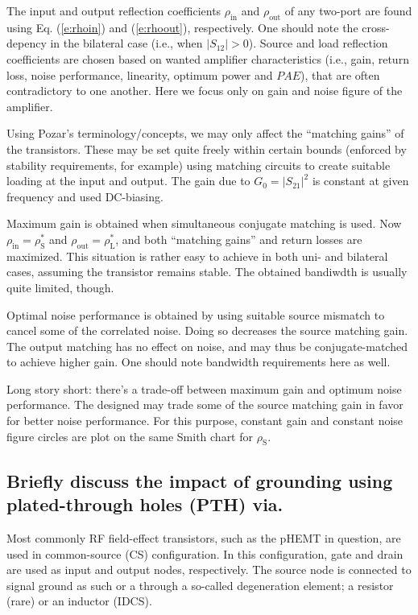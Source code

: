 \documentclass[a4paper, 12pt]{article}
\begin{document}
The input and output reflection coefficients $\rho_\mathrm{in}$ and $\rho_\mathrm{out}$ 
of any two-port are found using Eq. (\ref{e:rhoin}) and (\ref{e:rhoout}), respectively. 
One should note the cross-depency in the bilateral case (i.e., when $|S_{12}| > 0$). 
Source and load reflection coefficients are chosen based on wanted amplifier characteristics 
(i.e., gain, return loss, noise performance, linearity, optimum power and $\mathit{PAE}$), 
that are often contradictory to one another. Here we focus only on gain and noise figure 
of the amplifier.

Using Pozar's terminology/concepts, we may only affect the ``matching gains'' of the 
transistors. These may be set quite freely within certain bounds (enforced by stability 
requirements, for example) using matching circuits to create suitable loading at the 
input and output. The gain due to $G_0 = |S_{21}|^2$ is constant at given frequency 
and used DC-biasing. 

Maximum gain is obtained when simultaneous conjugate matching is used. Now 
$\rho_\mathrm{in} = \rho_\mathrm{S}^*$ and $\rho_\mathrm{out} = \rho_\mathrm{L}^*$, 
and both ``matching gains'' and return losses are maximized. This situation is rather 
easy to achieve in both uni- and bilateral cases, assuming the transistor remains stable. 
The obtained bandiwdth is usually quite limited, though.

Optimal noise performance is obtained by using suitable source mismatch to cancel some 
of the correlated noise. Doing so decreases the source matching gain. The output matching 
has no effect on noise, and may thus be conjugate-matched to achieve higher gain. One 
should note bandwidth requirements here as well.

Long story short: there's a trade-off between maximum gain and optimum noise performance. 
The designed may trade some of the source matching gain in favor for better noise performance.
For this purpose, constant gain and constant noise figure circles are plot on the same 
Smith chart for $\rho_\mathrm{S}$.


\subsection{Briefly discuss the impact of grounding using plated-through holes (PTH) via.}

Most commonly RF field-effect transistors, such as the pHEMT in question, are used in 
common-source (CS) configuration. In this configuration, gate and drain are used as input 
and output nodes, respectively. The source node is connected to signal ground as such or 
a through a so-called degeneration element; a resistor (rare) or an inductor (IDCS).
\end{document}
